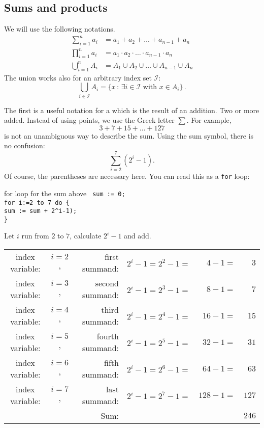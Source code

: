 
\subsection*{Sums and products}
We will use the following notations.
\begin{align*}
 \sum_{i=1}^n a_i &= a_1+a_2+\dots+a_{n-1}+a_n\\
 \prod_{i=1}^n a_i &= a_1 \cdot a_2 \cdot \dots \cdot a_{n-1}\cdot a_n\\
 \bigcup_{i=1}^n A_i &= A_1 \cup A_2 \cup \dots \cup A_{n-1}\cup A_n
\end{align*}
The union works also for an arbitrary index set $\mathcal{I}$:
$$
	\bigcup_{i \in \mathcal{I}} A_i = \{ x \,:\, \exists i \in \mathcal{I} \text{ with } x \in A_i \} \,.
$$

The first is a useful notation for a  which is
the result of an addition. Two or
more  added. Instead of using points, we use the Greek letter $\sum$. For example,
\[
3+7+15+\ldots+127 
\]
is not an unambiguous way to describe the sum. 
Using the sum symbol, there is no confusion:
\begin{equation*} %
\sum_{i=2}^7 (2^i-1).
\end{equation*}
Of course, the parentheses are necessary here.
You can read this as a {\texttt{for}} loop:

\begin{Boxx}{for loop for the sum above}
\textnormal{\texttt{
\hspace*{10mm}sum := 0;\\
\hspace*{10mm}for i:=2 to 7 do \{\\
\hspace*{15mm}sum := sum + 2^i-1);\\
\hspace*{10mm}\}
}
}
\end{Boxx}

\begin{Faust}
Let $i$ run from $2$ to $7${,} calculate $2^i-1$
and add.
\begin{tabular}{ccrrrr}
index variable: & $i=2$, & first summand: & $2^i-1=2^2-1=$&$4-1=$&$3$\\
index variable: & $i=3$, & second summand: & $2^i-1=2^3-1=$&$8-1=$&$7$\\
index variable: & $i=4$, & third summand: & $2^i-1=2^4-1=$&$16-1=$&$15$\\
index variable: & $i=5$, & fourth summand: & $2^i-1=2^5-1=$&$32-1=$&$31$\\
index variable: & $i=6$, & fifth summand: & $2^i-1=2^6-1=$&$64-1=$&$63$\\
index variable: & $i=7$, & last summand: & $2^i-1=2^7-1=$&\!\!$128-1=$&$127$\\
\hline
 & & Sum: & & &$246$
\end{tabular}
\end{Faust}

